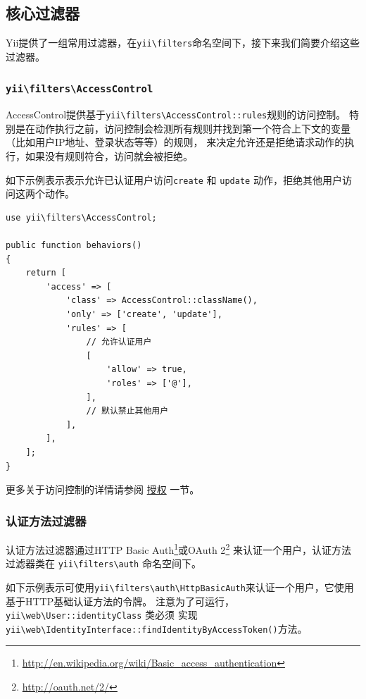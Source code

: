 \subsection{核心过滤器 \label{structure-filters.md::core-filters}}
Yii提供了一组常用过滤器，在\lstinline|yii\filters|命名空间下，接下来我们简要介绍这些过滤器。

\subsubsection{\texttt{yii{\allowbreak{}\textbackslash}filters{\allowbreak{}\textbackslash}AccessControl} \label{structure-filters.md::access-control}}
AccessControl提供基于\texttt{yii{\allowbreak{}\textbackslash}filters{\allowbreak{}\textbackslash}AccessControl\allowbreak{}::\allowbreak{}rules}规则的访问控制。
特别是在动作执行之前，访问控制会检测所有规则并找到第一个符合上下文的变量（比如用户IP地址、登录状态等等）的规则，
来决定允许还是拒绝请求动作的执行，如果没有规则符合，访问就会被拒绝。

如下示例表示表示允许已认证用户访问\lstinline|create| 和 \lstinline|update| 动作，拒绝其他用户访问这两个动作。

\lstset{language=php}\begin{lstlisting}
use yii\filters\AccessControl;

public function behaviors()
{
    return [
        'access' => [
            'class' => AccessControl::className(),
            'only' => ['create', 'update'],
            'rules' => [
                // 允许认证用户
                [
                    'allow' => true,
                    'roles' => ['@'],
                ],
                // 默认禁止其他用户
            ],
        ],
    ];
}
\end{lstlisting}
更多关于访问控制的详情请参阅 \hyperref[security-authorization.md]{授权} 一节。

\subsubsection{认证方法过滤器 \label{structure-filters.md::auth-method-filters}}
认证方法过滤器通过HTTP Basic Auth\footnote{\url{http://en.wikipedia.org/wiki/Basic\_access\_authentication}}或OAuth 2\footnote{\url{http://oauth.net/2/}}
来认证一个用户，认证方法过滤器类在 \lstinline|yii\filters\auth| 命名空间下。

如下示例表示可使用\texttt{yii{\allowbreak{}\textbackslash}filters{\allowbreak{}\textbackslash}auth{\allowbreak{}\textbackslash}HttpBasicAuth}来认证一个用户，它使用基于HTTP基础认证方法的令牌。
注意为了可运行，\texttt{yii{\allowbreak{}\textbackslash}web{\allowbreak{}\textbackslash}User\allowbreak{}::\allowbreak{}identityClass} 类必须
实现 \texttt{yii{\allowbreak{}\textbackslash}web{\allowbreak{}\textbackslash}IdentityInterface\allowbreak{}::\allowbreak{}findIdentityByAccessToken()}方法。

